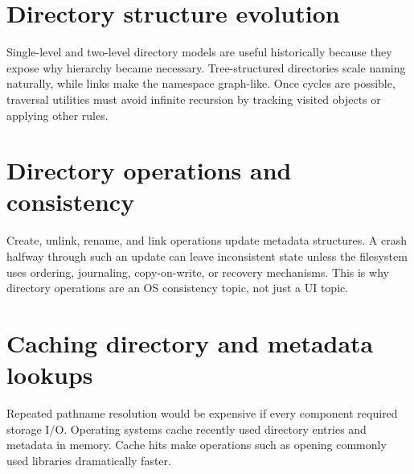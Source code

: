 \begin{mlfigure}
\end{mlfigure}

\section{Directory structure evolution}
Single-level and two-level directory models are useful historically because they expose why hierarchy became necessary. Tree-structured directories scale naming naturally, while links make the namespace graph-like. Once cycles are possible, traversal utilities must avoid infinite recursion by tracking visited objects or applying other rules.

\section{Directory operations and consistency}
Create, unlink, rename, and link operations update metadata structures. A crash halfway through such an update can leave inconsistent state unless the filesystem uses ordering, journaling, copy-on-write, or recovery mechanisms. This is why directory operations are an OS consistency topic, not just a UI topic.

\section{Caching directory and metadata lookups}
Repeated pathname resolution would be expensive if every component required storage I/O. Operating systems cache recently used directory entries and metadata in memory. Cache hits make operations such as opening commonly used libraries dramatically faster.

